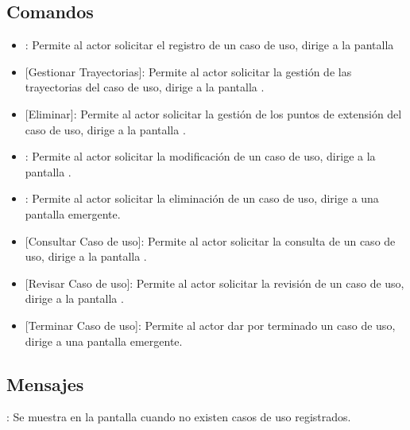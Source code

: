 \subsection{Comandos}
\begin{itemize}
	\item {}: Permite al actor solicitar el registro de un caso de uso, dirige a la pantalla 
	\item {} [Gestionar Trayectorias]: Permite al actor solicitar la gestión de las trayectorias del caso de
	uso, dirige a la pantalla .
	\item {} [Eliminar]: Permite al actor solicitar la gestión de los puntos de extensión del caso de uso, dirige a la pantalla .
	\item {}: Permite al actor solicitar la modificación de un caso de uso, dirige a la pantalla .
	\item {}: Permite al actor solicitar la eliminación de un caso de uso, dirige a una pantalla emergente.
	\item {} [Consultar Caso de uso]: Permite al actor solicitar la consulta de un caso de uso, dirige a la pantalla .\\
	\item {} [Revisar Caso de uso]: Permite al actor solicitar la revisión de un caso de uso, dirige a la pantalla .
	\item {} [Terminar Caso de uso]: Permite al actor dar por terminado un caso de uso, dirige a una pantalla emergente.
\end{itemize}

\subsection{Mensajes}

\begin{Citemize}
	\item {}: Se muestra en la pantalla  cuando no existen casos de uso registrados.
\end{Citemize}

